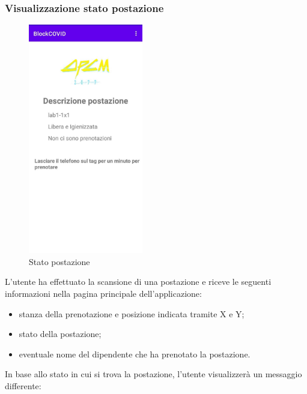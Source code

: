 \subsubsection{Visualizzazione stato postazione}
\begin{figure}[H]
	\centering
	\includegraphics[width=5cm]{res/images/DescrizionePostazione1.png}
	\caption{Stato postazione}
\end{figure}
L'utente ha effettuato la scansione di una postazione e riceve le seguenti informazioni nella pagina principale dell'applicazione:
\begin{itemize}
	\item stanza della prenotazione e posizione indicata tramite X e Y;
	\item stato della postazione;
	\item eventuale nome del dipendente che ha prenotato la postazione.
\end{itemize}
In base allo stato in cui si trova la postazione, l'utente visualizzerà un messaggio differente:
